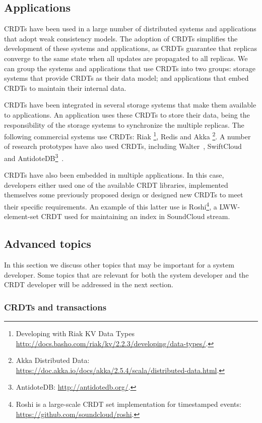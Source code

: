 \documentclass[12pt]{article}
\begin{document}
\subsection{Applications}

CRDTs have been used in a large number of distributed systems and applications
that adopt weak consistency models. 
The adoption of CRDTs simplifies the development of these systems and applications, 
as CRDTs guarantee that replicas converge to the same state when all updates are 
propagated to all replicas.
We can group the systems and applications that use CRDTs into two groups: storage
systems that provide CRDTs as their data model; and applications that embed CRDTs
to maintain their internal data.

CRDTs have been integrated in several storage systems that make them available 
to applications.
An application uses these CRDTs to store their data, being the responsibility of 
the storage systems to synchronize the multiple replicas.
The following commercial systems use CRDTs: Riak \footnote{Developing with Riak KV 
Data Types \url{http://docs.basho.com/riak/kv/2.2.3/developing/data-types/}.}, Redis \cite{rediscrdts} and Akka \footnote{Akka Distributed Data: \url{https://doc.akka.io/docs/akka/2.5.4/scala/distributed-data.html}.}.
A number of research prototypes have also used CRDTs, including Walter~\cite{Sovran11Transactional},
SwiftCloud~\cite{swiftcloud} and AntidoteDB\footnote{AntidoteDB: \url{http://antidotedb.org/}.}~\cite{Akkoorath16Cure}.

CRDTs have also been embedded in multiple applications. 
In this case, developers either used one of the available CRDT libraries,
implemented themselves some previously proposed design or designed new
CRDTs to meet their specific requirements. 
An example of this latter use is Roshi\footnote{Roshi is a large-scale CRDT set implementation for timestamped events: \url{https://github.com/soundcloud/roshi}.}, a LWW-element-set CRDT used 
for maintaining an index in SoundCloud stream.


\subsection{Advanced topics}

In this section we discuss other topics that may be important for a 
system developer. Some topics that are relevant for both the system developer
and the CRDT developer will be addressed in the next section.

\subsubsection{CRDTs and transactions}\label{sec:sysdev:adv:tx}
\end{document}
